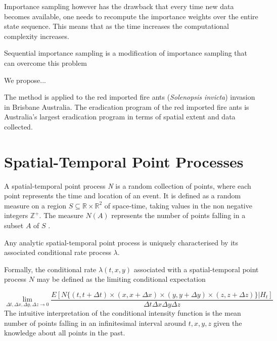 \documentclass[11pt,a4paper]{article}
\begin{document}
Importance sampling however has the drawback that every time new data becomes available, one needs to recompute the importance weights over the entire state sequence. This means that as the time increases the computational complexity increases.

Sequential importance sampling is a modification of importance sampling that can overcome this problem





\cite{Ducet}

We propose...
 

The method is applied to the red imported fire ants (\textit{Solenopsis invicta}) invasion in Brisbane Australia. The eradication program of the red imported fire ants is Australia's largest eradication program in terms of spatial extent and data collected. %










\section{Spatial-Temporal Point Processes}


A spatial-temporal point process \textit{N} is a random collection of points, where each point represents the time and location of an event.
It is defined as a random measure on a region $S \subseteq \mathbb{R} \times \mathbb{R}^2$ of space-time, taking values in the non negative integers $\mathbb{Z}^+$. The measure $N(A)$ represents the number of points falling in a subset $A$ of $S$ \cite{Shoenberg}.

Any analytic spatial-temporal point process is uniquely characterised by its associated conditional rate process $\lambda$. 

Formally, the conditional rate $\lambda(t,x,y)$ associated with a spatial-temporal point process $N$ may be defined as the limiting conditional expectation

\[
\lim_{\Delta t, \Delta x, \Delta y, \Delta z \to 0} \frac{ E [ N \{ ( t, t + \Delta t ) \times  ( x, x + \Delta x) \times  ( y, y + \Delta y) \times  ( z, z + \Delta z)\} | H_{t} ]}{\Delta t \Delta x \Delta y \Delta z}
\]
The intuitive interpretation of the conditional intensity function is the mean number of points falling in an infinitesimal interval around $t, x, y, z$ given the knowledge about all points in the past.
\end{document}
